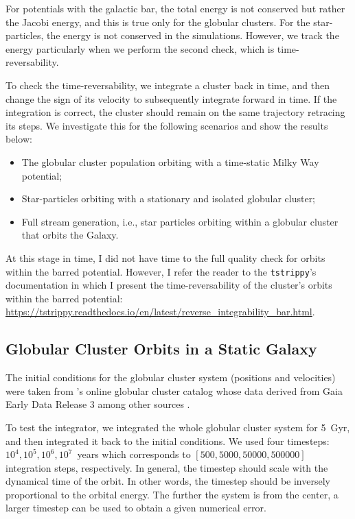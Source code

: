     For potentials with the galactic bar, the total energy is not conserved but rather the Jacobi energy, and this is true only for the globular clusters. For the star-particles, the energy is not conserved in the simulations. However, we track the energy particularly when we perform the second check, which is time-reversability.

    To check the time-reversability, we integrate a cluster back in time, and then change the sign of its velocity to subsequently integrate forward in time. If the integration is correct, the cluster should remain on the same trajectory retracing its steps. We investigate this for the following scenarios and show the results below: 
    \begin{itemize}
        \item The globular cluster population orbiting with a time-static Milky Way potential;
        \item Star-particles orbiting with a stationary and isolated globular cluster;
        \item Full stream generation, i.e., star particles orbiting within a globular cluster that orbits the Galaxy.
    \end{itemize}

    At this stage in time, I did not have time to the full quality check for orbits within the barred potential. However, I refer the reader to the \texttt{tstrippy}'s documentation in which I present the time-reversability of the cluster's orbits within the barred potential: \href{https://tstrippy.readthedocs.io/en/latest/reverse_integrability_bar.html}{https://tstrippy.readthedocs.io/en/latest/reverse_integrability_bar.html}.

    \subsection{Globular Cluster Orbits in a Static Galaxy}
        The initial conditions for the globular cluster system (positions and velocities) were taken from \citet{2018MNRAS.478.1520B}'s online globular cluster catalog whose data derived from Gaia Early Data Release 3 among other sources \citep{2021MNRAS.505.5957B,2021A&A...649A...1G,2023A&A...674A...1G}. 

        To test the integrator, we integrated the whole globular cluster system for 5~Gyr, and then integrated it back to the initial conditions. We used four timesteps: $10^4,10^5,10^6,10^7$~years which corresponds to $\left[500,5000,50000,500000\right]$ integration steps, respectively. In general, the timestep should scale with the dynamical time of the orbit. In other words, the timestep should be inversely proportional to the orbital energy. The further the system is from the center, a larger timestep can be used to obtain a given numerical error. 
        
